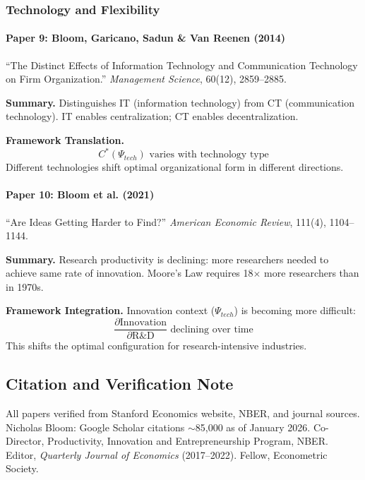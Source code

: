 \subsubsection{Technology and Flexibility}

\paragraph{Paper 9: Bloom, Garicano, Sadun \& Van Reenen (2014)}

``The Distinct Effects of Information Technology and Communication Technology on Firm Organization.''
\textit{Management Science}, 60(12), 2859--2885.

\textbf{Summary.}
Distinguishes IT (information technology) from CT (communication technology).
IT enables centralization; CT enables decentralization.

\textbf{Framework Translation.}
\begin{equation}
  C^*(\Psi_{tech}) \text{ varies with technology type}
\end{equation}
Different technologies shift optimal organizational form in different directions.

\paragraph{Paper 10: Bloom et al. (2021)}

``Are Ideas Getting Harder to Find?''
\textit{American Economic Review}, 111(4), 1104--1144.

\textbf{Summary.}
Research productivity is declining: more researchers needed to achieve same rate of
innovation. Moore's Law requires 18$\times$ more researchers than in 1970s.

\textbf{Framework Integration.}
Innovation context ($\Psi_{tech}$) is becoming more difficult:
\begin{equation}
  \frac{\partial \text{Innovation}}{\partial \text{R\&D}} \text{ declining over time}
\end{equation}
This shifts the optimal configuration for research-intensive industries.

\subsection{Citation and Verification Note}

All papers verified from Stanford Economics website, NBER, and journal sources.
Nicholas Bloom: Google Scholar citations $\sim$85,000 as of January 2026.
Co-Director, Productivity, Innovation and Entrepreneurship Program, NBER.
Editor, \textit{Quarterly Journal of Economics} (2017--2022).
Fellow, Econometric Society.

